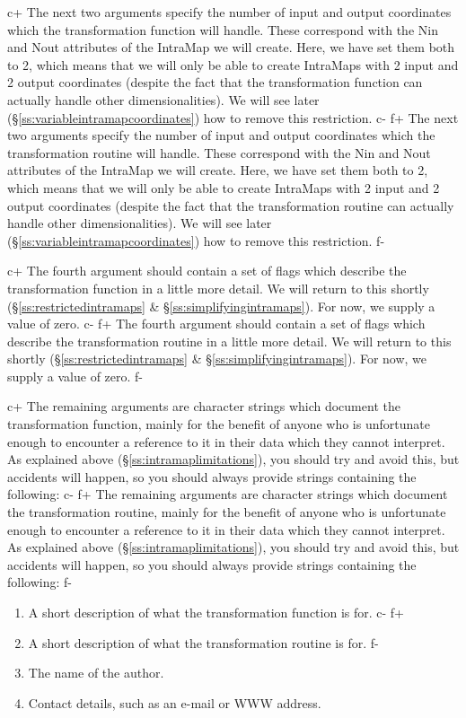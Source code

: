 \documentclass[twoside,11pt]{starlink}
\providecommand{\secref}[1]{\S\ref{#1}}
\begin{document}
c+
The next two arguments specify the number of input and output
coordinates which the transformation function will handle. These
correspond with the Nin and Nout attributes of the IntraMap we will
create. Here, we have set them both to 2, which means that we will
only be able to create IntraMaps with 2 input and 2 output coordinates
(despite the fact that the transformation function can actually handle
other dimensionalities). We will see later
(\secref{ss:variableintramapcoordinates}) how to remove this
restriction.
c-
f+
The next two arguments specify the number of input and output
coordinates which the transformation routine will handle. These
correspond with the Nin and Nout attributes of the IntraMap we will
create. Here, we have set them both to 2, which means that we will
only be able to create IntraMaps with 2 input and 2 output coordinates
(despite the fact that the transformation routine can actually handle
other dimensionalities). We will see later
(\secref{ss:variableintramapcoordinates}) how to remove this
restriction.
f-

c+
The fourth argument should contain a set of flags which describe the
transformation function in a little more detail. We will return to
this shortly (\secref{ss:restrictedintramaps} \&
\secref{ss:simplifyingintramaps}). For now, we supply a value of zero.
c-
f+
The fourth argument should contain a set of flags which describe the
transformation routine in a little more detail. We will return to this
shortly (\secref{ss:restrictedintramaps} \&
\secref{ss:simplifyingintramaps}). For now, we supply a value of zero.
f-

c+
The remaining arguments are character strings which document the
transformation function, mainly for the benefit of anyone who is
unfortunate enough to encounter a reference to it in their data which
they cannot interpret. As explained above
(\secref{ss:intramaplimitations}), you should try and avoid this, but
accidents will happen, so you should always provide strings containing
the following:
c-
f+
The remaining arguments are character strings which document the
transformation routine, mainly for the benefit of anyone who is
unfortunate enough to encounter a reference to it in their data which
they cannot interpret. As explained above
(\secref{ss:intramaplimitations}), you should try and avoid this, but
accidents will happen, so you should always provide strings containing
the following:
f-

\begin{enumerate}
c+
\item A short description of what the transformation function is for.
c-
f+
\item A short description of what the transformation routine is for.
f-
\item The name of the author.
\item Contact details, such as an e-mail or WWW address.
\end{enumerate}
\end{document}
